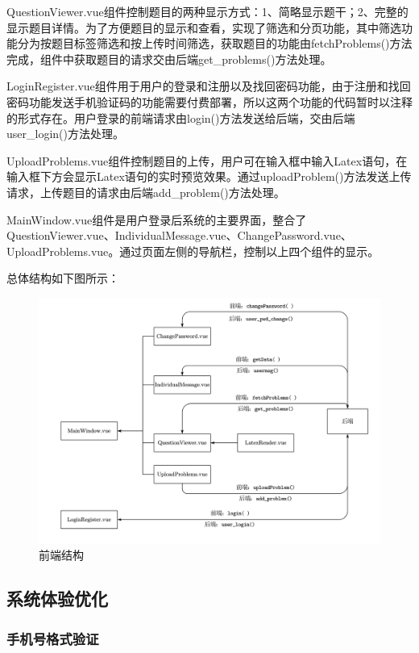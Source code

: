 \documentclass[a4paper,AutoFakeBold={2.7}]{ctexart} %
\begin{document}
QuestionViewer.vue组件控制题目的两种显示方式：1、简略显示题干；2、完整的显示题目详情。为了方便题目的显示和查看，实现了筛选和分页功能，其中筛选功能分为按题目标签筛选和按上传时间筛选，获取题目的功能由fetchProblems()方法完成，组件中获取题目的请求交由后端get\_problems()方法处理。

LoginRegister.vue组件用于用户的登录和注册以及找回密码功能，由于注册和找回密码功能发送手机验证码的功能需要付费部署，所以这两个功能的代码暂时以注释的形式存在。用户登录的前端请求由login()方法发送给后端，交由后端user\_login()方法处理。

UploadProblems.vue组件控制题目的上传，用户可在输入框中输入Latex语句，在输入框下方会显示Latex语句的实时预览效果。通过uploadProblem()方法发送上传请求，上传题目的请求由后端add\_problem()方法处理。

MainWindow.vue组件是用户登录后系统的主要界面，整合了QuestionViewer.vue、IndividualMessage.vue、ChangePassword.vue、UploadProblems.vue。通过页面左侧的导航栏，控制以上四个组件的显示。

总体结构如下图所示：

\begin{figure}[H]
	\centering
	\includegraphics[width=0.85\linewidth]{./图片/前端结构.pdf}
	\caption{前端结构}\label{前端结构}
\end{figure}

\subsection{系统体验优化}

\subsubsection{手机号格式验证}
\end{document}
